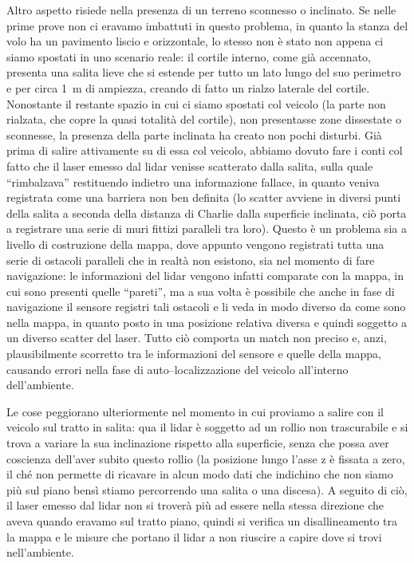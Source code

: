 Altro aspetto risiede nella presenza di un terreno sconnesso o inclinato. 
Se nelle prime prove non ci eravamo imbattuti in questo problema, in quanto la stanza del volo ha un pavimento liscio e orizzontale, lo stesso non è stato non appena ci siamo spostati in uno scenario reale: il cortile interno, come già accennato, presenta una salita lieve che si estende per tutto un lato lungo del suo perimetro e per circa \SI{1}{\metre} di ampiezza, creando di fatto un rialzo laterale del cortile.
Nonostante il restante spazio in cui ci siamo spostati col veicolo (la parte non rialzata, che copre la quasi totalità del cortile), non presentasse zone dissestate o sconnesse, la presenza della parte inclinata ha creato non pochi disturbi. 
Già prima di salire attivamente su di essa col veicolo, abbiamo dovuto fare i conti col fatto che il laser emesso dal lidar venisse scatterato dalla salita, sulla quale ``rimbalzava'' restituendo indietro una informazione fallace, in quanto veniva registrata come una barriera non ben definita (lo scatter avviene in diversi punti della salita a seconda della distanza di Charlie dalla superficie inclinata, ciò porta a registrare una serie di muri fittizi paralleli tra loro). 
Questo è un problema sia a livello di costruzione della mappa, dove appunto vengono registrati tutta una serie di ostacoli paralleli che in realtà non esistono, sia nel momento di fare navigazione: le informazioni del lidar vengono infatti comparate con la mappa, in cui sono presenti quelle ``pareti'', ma a sua volta è possibile che anche in fase di navigazione il sensore registri tali ostacoli e li veda in modo diverso da come sono nella mappa, in quanto posto in una posizione relativa diversa e quindi soggetto a un diverso scatter del laser.
Tutto ciò comporta un match non preciso e, anzi, plausibilmente scorretto tra le informazioni del sensore e quelle della mappa, causando errori nella fase di auto--localizzazione del veicolo all'interno dell'ambiente.

Le cose peggiorano ulteriormente nel momento in cui proviamo a salire con il veicolo sul tratto in salita: qua il lidar è soggetto ad un rollio non trascurabile e si trova a variare la sua inclinazione rispetto alla superficie, senza che possa aver coscienza dell'aver subito questo rollio (la posizione lungo l'asse z è fissata a zero, il ché non permette di ricavare in alcun modo dati che indichino che non siamo più sul piano bensì stiamo percorrendo una salita o una discesa). 
A seguito di ciò, il laser emesso dal lidar non si troverà più ad essere nella stessa direzione che aveva quando eravamo sul tratto piano, quindi si verifica un disallineamento tra la mappa e le misure che portano il lidar a non riuscire a capire dove si trovi nell'ambiente. 

